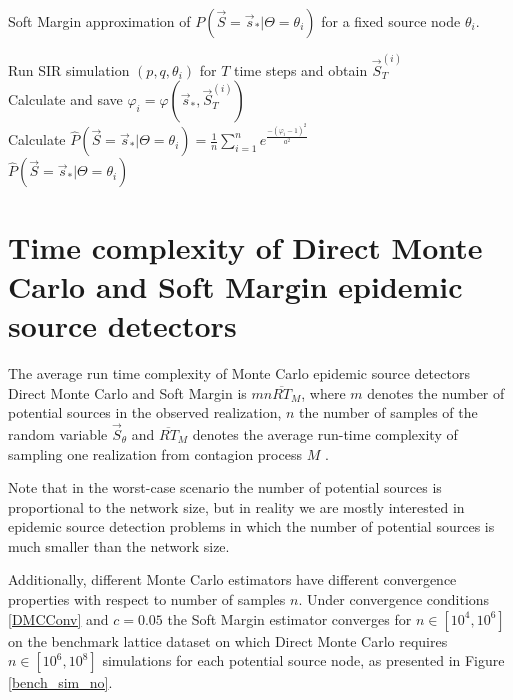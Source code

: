 \documentclass[times, utf8, diplomski]{fer}
\begin{document}
\vspace{5mm}
\begin{algorithm}[H]
\label{SMC_alg}
\caption{Soft Margin approximation of $P(\vec S = \vec s_* | \Theta = \theta_i)$ for a fixed source node $\theta_i$.}
  {
    Run SIR simulation $(p, q, \theta_i)$ for $T$ time steps and obtain  
    $\vec S_T^{(i)}$\\
    Calculate and save $\varphi_i = \varphi(\vec s_*, \vec S_T^{(i)})$\\
 }
  Calculate $\hat{P}(\vec S = \vec s_* | \Theta = \theta_i) = \frac{1}{n} \sum_{i = 1}^{n} e ^ {\frac{-(\varphi_i -1)^2}{a^2}}$\\
  \Return $\hat{P}(\vec S = \vec s_* | \Theta = \theta_i)$
\end{algorithm}


\section{Time complexity of Direct Monte Carlo and Soft Margin epidemic source detectors}
The average run time complexity of  Monte Carlo epidemic source detectors Direct Monte Carlo and Soft Margin is $ m n \overline{RT}_{M}$, where $m$ denotes the number of potential sources in the observed  realization, $n$ the number of samples of the random variable $\vec S_{\theta}$  and $\overline{RT}_M$ denotes the average run-time complexity of sampling one realization from contagion process $M$ \cite{Nino}.

Note that in the worst-case scenario the number of potential sources is proportional to the network size, but in reality we are mostly interested in epidemic source detection problems in which the number of potential sources is much smaller than the network size. 

Additionally, different Monte Carlo estimators have different convergence properties with respect to  number of samples $n$. Under convergence conditions \ref{DMCConv} and $c=0.05$ the Soft Margin estimator converges for $n \in [10^4, 10^6]$ on the benchmark lattice dataset on which Direct Monte Carlo requires $n\in[10^6, 10^8]$ simulations for each potential source node, as presented in Figure \ref{bench_sim_no}.
\end{document}
